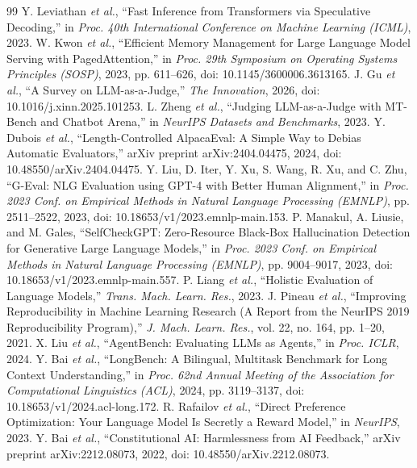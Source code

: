 ﻿\documentclass[a4paper,12pt]{article}
\begin{document}
\begin{thebibliography}{99}
 Y. Leviathan \emph{et al.}, ``Fast Inference from Transformers via Speculative Decoding,'' in \emph{Proc. 40th International Conference on Machine Learning (ICML)}, 2023.
 W. Kwon \emph{et al.}, ``Efficient Memory Management for Large Language Model Serving with PagedAttention,'' in \emph{Proc. 29th Symposium on Operating Systems Principles (SOSP)}, 2023, pp. 611--626, doi: 10.1145/3600006.3613165.
 J. Gu \emph{et al.}, ``A Survey on LLM-as-a-Judge,'' \emph{The Innovation}, 2026, doi: 10.1016/j.xinn.2025.101253.
 L. Zheng \emph{et al.}, ``Judging LLM-as-a-Judge with MT-Bench and Chatbot Arena,'' in \emph{NeurIPS Datasets and Benchmarks}, 2023.
 Y. Dubois \emph{et al.}, ``Length-Controlled AlpacaEval: A Simple Way to Debias Automatic Evaluators,'' arXiv preprint arXiv:2404.04475, 2024, doi: 10.48550/arXiv.2404.04475.
 Y. Liu, D. Iter, Y. Xu, S. Wang, R. Xu, and C. Zhu, ``G-Eval: NLG Evaluation using GPT-4 with Better Human Alignment,'' in \emph{Proc. 2023 Conf. on Empirical Methods in Natural Language Processing (EMNLP)}, pp. 2511--2522, 2023, doi: 10.18653/v1/2023.emnlp-main.153.
 P. Manakul, A. Liusie, and M. Gales, ``SelfCheckGPT: Zero-Resource Black-Box Hallucination Detection for Generative Large Language Models,'' in \emph{Proc. 2023 Conf. on Empirical Methods in Natural Language Processing (EMNLP)}, pp. 9004--9017, 2023, doi: 10.18653/v1/2023.emnlp-main.557.
 P. Liang \emph{et al.}, ``Holistic Evaluation of Language Models,'' \emph{Trans. Mach. Learn. Res.}, 2023.
 J. Pineau \emph{et al.}, ``Improving Reproducibility in Machine Learning Research (A Report from the NeurIPS 2019 Reproducibility Program),'' \emph{J. Mach. Learn. Res.}, vol. 22, no. 164, pp. 1--20, 2021.
 X. Liu \emph{et al.}, ``AgentBench: Evaluating LLMs as Agents,'' in \emph{Proc. ICLR}, 2024.
 Y. Bai \emph{et al.}, ``LongBench: A Bilingual, Multitask Benchmark for Long Context Understanding,'' in \emph{Proc. 62nd Annual Meeting of the Association for Computational Linguistics (ACL)}, 2024, pp. 3119--3137, doi: 10.18653/v1/2024.acl-long.172.
 R. Rafailov \emph{et al.}, ``Direct Preference Optimization: Your Language Model Is Secretly a Reward Model,'' in \emph{NeurIPS}, 2023.
 Y. Bai \emph{et al.}, ``Constitutional AI: Harmlessness from AI Feedback,'' arXiv preprint arXiv:2212.08073, 2022, doi: 10.48550/arXiv.2212.08073.

\end{thebibliography}
\end{document}
